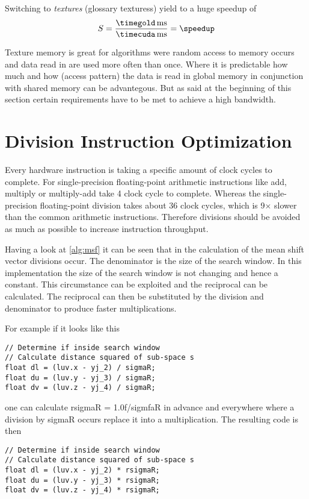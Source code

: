 Switching to \emph{textures} (glossary texturess) yield to a huge speedup of 
\fpDiv{\speedup}{\timegold}{\timecuda}
\begin{equation*}\label{eq:speedup2}
	S = \frac{\unit[\timegold]{ms}}{\unit[\timecuda]{ms}} = \speedup
\end{equation*}

Texture memory is great for algorithms were random access to memory occurs and
data read in are used more often than once. Where it is predictable how much and 
how (access pattern) the data is read in global memory in conjunction with shared
memory can be advantegous. But as said at the beginning of this section certain
requirements have to be met to achieve a high bandwidth. 

\section{Division Instruction Optimization}
\label{sec:expensive_divisions}
Every hardware instruction is taking a specific amount of clock cycles to complete. 
For single-precision floating-point arithmetic instructions like add, multiply
or multiply-add take 4 clock cycle to complete. Whereas the single-precision
floating-point division takes about 36 clock cycles, which is 9$\times$ slower 
than the common arithmetic instructions. Therefore divisions should be avoided
as much as possible to increase instruction throughput. 


Having a look at \autoref{alg:msf} it can be seen that in the calculation of the
mean shift vector divisions occur. The denominator is the size of the search
window. In this implementation the size of the search window is not changing and
hence a constant. This circumstance can be exploited and the reciprocal can be
calculated. The reciprocal can then be substituted by the division and denominator
to produce faster multiplications.

For example if it looks like this
\begin{lstlisting}[caption=Expensive divison, label=lst:division]
// Determine if inside search window
// Calculate distance squared of sub-space s
float dl = (luv.x - yj_2) / sigmaR;               
float du = (luv.y - yj_3) / sigmaR;               
float dv = (luv.z - yj_4) / sigmaR;
\end{lstlisting}
one can calculate \textsf{rsigmaR} = 1.0f/\textsf{sigmfaR} in advance and everywhere where a
division by \textsf{sigmaR} occurs replace it into a multiplication. The
resulting code is then
\begin{lstlisting}[caption=Division turned into fast multiplication, label=lst:precalcdivision]
// Determine if inside search window
// Calculate distance squared of sub-space s
float dl = (luv.x - yj_2) * rsigmaR;               
float du = (luv.y - yj_3) * rsigmaR;               
float dv = (luv.z - yj_4) * rsigmaR;
\end{lstlisting}

